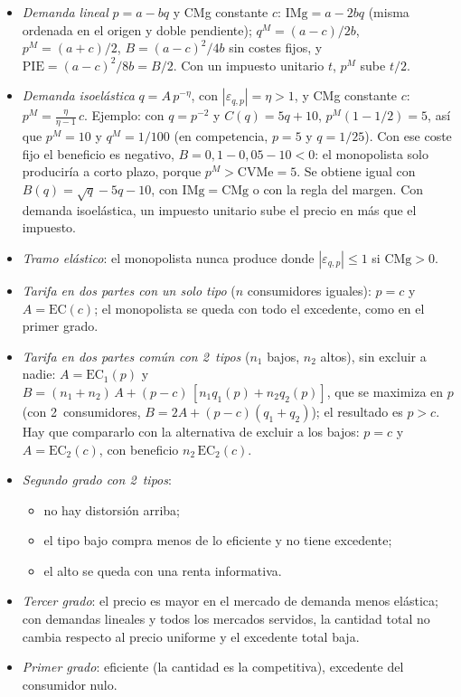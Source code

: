 \documentclass[11pt]{article}
\begin{document}
\begin{itemize}
\item \emph{Demanda lineal} $p=a-bq$ y CMg constante $c$: $\mathrm{IMg}=a-2bq$ (misma ordenada en el origen y doble pendiente); $q^M=(a-c)/2b$, $p^M=(a+c)/2$, $B=(a-c)^2/4b$ sin costes fijos, y $\mathrm{PIE}=(a-c)^2/8b=B/2$. Con un impuesto unitario $t$, $p^M$ sube $t/2$.
\item \emph{Demanda isoelástica} $q=A\,p^{-\eta}$, con $|\varepsilon_{q,p}|=\eta>1$, y CMg constante $c$: $p^M=\frac{\eta}{\eta-1}\,c$. Ejemplo: con $q=p^{-2}$ y $C(q)=5q+10$, $p^M(1-1/2)=5$, así que $p^M=10$ y $q^M=1/100$ (en competencia, $p=5$ y $q=1/25$). Con ese coste fijo el beneficio es negativo, $B=0{,}1-0{,}05-10<0$: el monopolista solo produciría a corto plazo, porque $p^M>\mathrm{CVMe}=5$. Se obtiene igual con $B(q)=\sqrt{q}-5q-10$, con $\mathrm{IMg}=\mathrm{CMg}$ o con la regla del margen. Con demanda isoelástica, un impuesto unitario sube el precio en más que el impuesto.
\item \emph{Tramo elástico}: el monopolista nunca produce donde $|\varepsilon_{q,p}|\leq 1$ si $\mathrm{CMg}>0$.
\item \emph{Tarifa en dos partes con un solo tipo} ($n$ consumidores iguales): $p=c$ y $A=\mathrm{EC}(c)$; el monopolista se queda con todo el excedente, como en el primer grado.
\item \emph{Tarifa en dos partes común con 2~tipos} ($n_1$ bajos, $n_2$ altos), sin excluir a nadie: $A=\mathrm{EC}_1(p)$ y $B=(n_1+n_2)\,A+(p-c)\,[n_1q_1(p)+n_2q_2(p)]$, que se maximiza en $p$ (con 2~consumidores, $B=2A+(p-c)(q_1+q_2)$); el resultado es $p>c$. Hay que compararlo con la alternativa de excluir a los bajos: $p=c$ y $A=\mathrm{EC}_2(c)$, con beneficio $n_2\,\mathrm{EC}_2(c)$.
\item \emph{Segundo grado con 2~tipos}:
  \begin{itemize}
  \item no hay distorsión arriba;
  \item el tipo bajo compra menos de lo eficiente y no tiene excedente;
  \item el alto se queda con una renta informativa.
  \end{itemize}
\item \emph{Tercer grado}: el precio es mayor en el mercado de demanda menos elástica; con demandas lineales y todos los mercados servidos, la cantidad total no cambia respecto al precio uniforme y el excedente total baja.
\item \emph{Primer grado}: eficiente (la cantidad es la competitiva), excedente del consumidor nulo.

\end{itemize}
\end{document}
